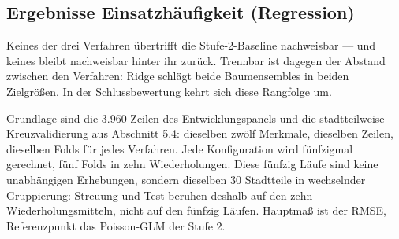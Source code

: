 \documentclass[12pt,a4paper]{article}
\begin{document}
%
\subsection{Ergebnisse Einsatzhäufigkeit (Regression)}
\label{sec:ergebnisse-menge}

Keines der drei Verfahren übertrifft die Stufe-2-Baseline nachweisbar --- und keines bleibt nachweisbar hinter ihr zurück. Trennbar ist dagegen der Abstand zwischen den Verfahren: Ridge schlägt beide Baumensembles in beiden Zielgrößen. In der Schlussbewertung kehrt sich diese Rangfolge um.
 
Grundlage sind die 3.960 Zeilen des Entwicklungspanels und die stadtteilweise Kreuzvalidierung aus Abschnitt 5.4: dieselben zwölf Merkmale, dieselben Zeilen, dieselben Folds für jedes Verfahren. Jede Konfiguration wird fünfzigmal gerechnet, fünf Folds in zehn Wiederholungen. Diese fünfzig Läufe sind keine unabhängigen Erhebungen, sondern dieselben 30 Stadtteile in wechselnder Gruppierung: Streuung und Test beruhen deshalb auf den zehn Wiederholungsmitteln, nicht auf den fünfzig Läufen. Hauptmaß ist der RMSE, Referenzpunkt das Poisson-GLM der Stufe 2.
 
\end{document}
